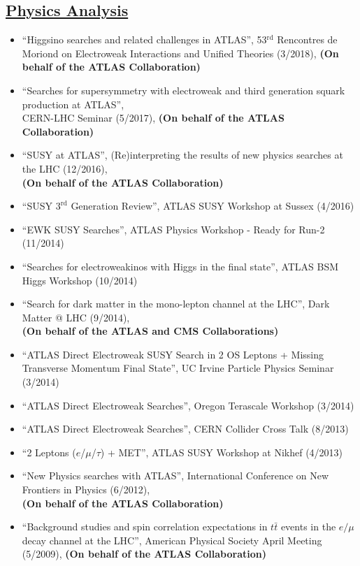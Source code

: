 \documentclass[a4paper,10pt]{article}
\begin{document}
\subsection{\underline{Physics Analysis}}
\vspace{1mm}
\begin{itemize}
	\item ``Higgsino searches and related challenges in ATLAS'', 53$^{\mathrm{rd}}$ Rencontres de Moriond on Electroweak Interactions and Unified Theories (3/2018), {\bf (On behalf of the ATLAS Collaboration)}
	\item ``Searches for supersymmetry with electroweak and third generation squark production at ATLAS'', \\ CERN-LHC Seminar (5/2017), 
	{\bf (On behalf of the ATLAS Collaboration)}
	\item ``SUSY at ATLAS'', (Re)interpreting the results of new physics searches at the LHC (12/2016),
	\\ {\bf (On behalf of the ATLAS Collaboration)}
	\item ``SUSY $3^{\mathrm{rd}}$ Generation Review'', ATLAS SUSY Workshop at Sussex (4/2016)
	\item ``EWK SUSY Searches'', ATLAS Physics Workshop - Ready for Run-2  (11/2014)
	\item ``Searches for electroweakinos with Higgs in the final state'', ATLAS BSM Higgs Workshop (10/2014)
	\item  ``Search for dark matter in the mono-lepton channel at the LHC'', Dark Matter @ LHC (9/2014), 
	\\ {\bf (On behalf of the ATLAS and CMS Collaborations)}
	\item ``ATLAS Direct Electroweak SUSY Search in 2 OS Leptons + Missing Transverse Momentum Final State'', 
	UC Irvine Particle Physics Seminar (3/2014)
	\item ``ATLAS Direct Electroweak Searches'', Oregon Terascale Workshop (3/2014)
	\item ``ATLAS Direct Electroweak Searches'', CERN Collider Cross Talk (8/2013)
	\item ``2 Leptons ($e$/$\mu$/$\tau$) + MET'', ATLAS SUSY Workshop at Nikhef (4/2013)
	\item ``New Physics searches with ATLAS'', International Conference on New Frontiers in Physics (6/2012),
	\\ {\bf (On behalf of the ATLAS Collaboration)}
	\item ``Background studies and spin correlation expectations in $t\bar{t}$ events in the $e/\mu$ decay channel at the LHC'',
	American Physical Society April Meeting (5/2009), {\bf (On behalf of the ATLAS Collaboration)}
\end{itemize} 
\end{document}
